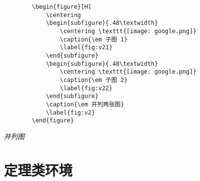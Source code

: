 \documentclass[a4paper, 12pt, UTF8]{ctexart}
\begin{document}
\begin{listing}[ht]
    \begin{verbatim}
        \begin{figure}[H]
            \centering
            \begin{subfigure}{.48\textwidth}
                \centering \texttt{[image: google.png]}
                \caption{\em 子图 1}
                \label{fig:v21}
            \end{subfigure}
            \begin{subfigure}{.48\textwidth}
                \centering \texttt{[image: google.png]}
                \caption{\em 子图 2}
                \label{fig:v22}
            \end{subfigure}
            \caption{\em 并列两张图}
            \label{fig:v2}
        \end{figure}
    \end{verbatim}
    \caption{\em 并列图}
    \label{subfigure}
\end{listing}

\clearpage

\section{定理类环境}
\begin{defn}{}{}
    
\end{defn}

\begin{lem}{}{}
    
\end{lem}

\begin{thm}{}{}
    \begin{case}
        
    \end{case}
    \begin{case}
        
    \end{case}
\end{thm}

\begin{rem}
    
\end{rem}

\begin{cor}{}{}
    
\end{cor}
\end{document}

